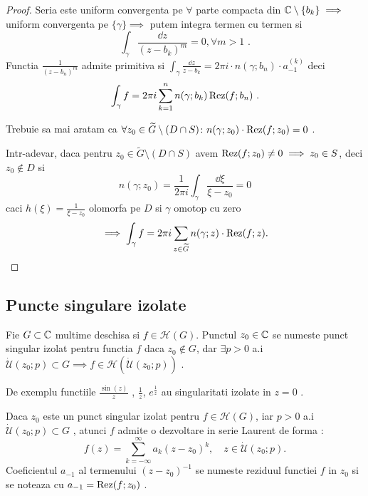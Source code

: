 \begin{theorem}
\begin{proof}
        Seria este uniform convergenta pe $\forall$ parte compacta din
        $\mathbb{C} \setminus \{b_k \} \implies$ uniform convergenta pe
        $\{ \gamma \} \implies$ putem integra termen cu termen si
        \[
            \int_{\gamma} \frac{\dd z}{(z-b_k)^m}  = 0 , \forall m>1 \text{ .}
        \]
        Functia $\displaystyle \frac{1}{(z-b_n)^m}$ admite primitiva si
        $\displaystyle
            \int_{\gamma} \frac{\dd z} {z - b_k} = 2 \pi i \cdot n(\gamma;b_n) \cdot a_{-1}^{(k)}
        $ deci
        \[
            \int_{\gamma} f = 2 \pi i \sum_{k=1}^{n} n(\gamma; b_k) \operatorname{Rez}(f;b_n)  \text{ .}
        \]

        Trebuie sa mai aratam ca $\forall z_0 \in \widetilde{G} \setminus(D \cap S)
        \colon n(\gamma; z_0)\cdot \operatorname{Rez}(f;z_0) = 0$ .

        Intr-adevar, daca pentru
        $z_0\in \widetilde{G} \setminus (D\cap S)$ avem
        $\operatorname{Rez}(f;z_0) \neq 0 \implies z_0 \in S $, deci $z_0\notin D$ si
        \[
            n(\gamma;z_0) = \frac{1}{2 \pi i} \int_{\gamma}
            \frac{\dd \xi}{\xi - z_0} = 0
        \]
        caci $h(\xi) = \frac{1}{\xi - z_0}$ olomorfa pe $D$ si $\gamma$ omotop cu zero
        \[
            \implies \int_{\gamma} f = 2 \pi i \sum_{z\in \widetilde{G}} n(\gamma;z) \cdot \operatorname{Rez}(f;z) .
        \]

    \end{proof}
\end{theorem}

\subsection{Puncte singulare izolate}

\begin{definition}
    Fie $G\subset \mathbb{C}$ multime deschisa si $f\in\mathcal{H}(G)$. Punctul $z_0 \in \mathbb{C}$
    se numeste punct singular izolat pentru functia $f$ daca $z_0 \notin G$, dar
    $\exists p>0$ a.i
    $\mathcal{\dot{U}}(z_0;p)\subset G \implies f \in \mathcal{H}(\mathcal{\dot{U}}(z_0;p))$ .
\end{definition}

\begin{observation}
    De exemplu functiile $\frac{\sin(z)}{z}$ , $\frac{1}{z}$, $e^{\frac{1}{z}}$
    au singularitati izolate in $z=0$ .
\end{observation}

\begin{observation}
    Daca $z_0$ este un punct singular izolat pentru $f\in\mathcal{H}(G)$, iar
    $p>0$ a.i $\mathcal{\dot{U}}(z_0;p)\subset G$ , atunci $f$ admite o dezvoltare in
    serie Laurent de forma :
    \[
        f(z) = \sum_{k=-\infty}^{\infty} a_{k}(z-z_0)^{k},\quad z\in \mathcal{\dot{U}}(z_0;p) .
    \]
    Coeficientul $a_{-1}$ al termenului $(z-z_0)^{-1}$ se numeste reziduul functiei $f$
    in $z_0$ si se noteaza cu $a_{-1} = \operatorname{Rez}(f;z_0)$ .
\end{observation}

